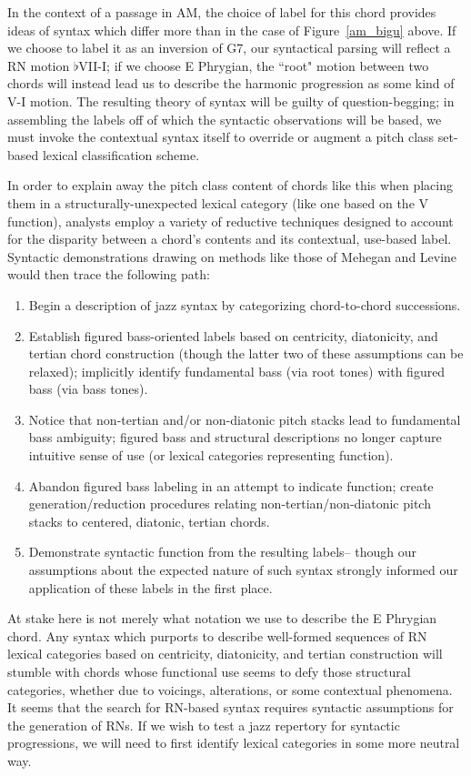 In the context of a passage in AM, the choice of label for this chord provides ideas of syntax which differ more than in the case of Figure~\ref{am_bigu} above.  If we choose to label it as an inversion of G7, our syntactical parsing will reflect a RN motion $\flat$VII-I; if we choose E Phrygian, the ``root" motion between two chords will instead lead us to describe the harmonic progression as some kind of V-I motion.  The resulting theory of syntax will be guilty of question-begging; in assembling the labels off of which the syntactic observations will be based, we must invoke the contextual syntax itself to override or augment a pitch class set-based lexical classification scheme.

In order to explain away the pitch class content of chords like this when placing them in a structurally-unexpected lexical category (like one based on the V function), analysts employ a variety of reductive techniques designed to account for the disparity between a chord's contents and its contextual, use-based label.  Syntactic demonstrations drawing on methods like those of Mehegan and Levine would then trace the following path:
\begin{enumerate}
	\item Begin a description of jazz syntax by categorizing chord-to-chord successions.
	\item Establish figured bass-oriented labels based on centricity, diatonicity, and tertian chord construction (though the latter two of these assumptions can be relaxed); implicitly identify fundamental bass (via root tones) with figured bass (via bass tones).
	\item Notice that non-tertian and/or non-diatonic pitch stacks lead to fundamental bass ambiguity; figured bass and structural descriptions no longer capture intuitive sense of use (or lexical categories representing function).
	\item Abandon figured bass labeling in an attempt to indicate function; create generation/reduction procedures relating non-tertian/non-diatonic pitch stacks to centered, diatonic, tertian chords.
	\item Demonstrate syntactic function from the resulting labels-- though our assumptions about the expected nature of such syntax strongly informed our application of these labels in the first place.
\end{enumerate}

At stake here is not merely what notation we use to describe the E Phrygian chord.  Any syntax which purports to describe well-formed sequences of RN lexical categories based on centricity, diatonicity, and tertian construction will stumble with chords whose functional use seems to defy those structural categories, whether due to voicings, alterations, or some contextual phenomena.  It seems that the search for RN-based syntax requires syntactic assumptions for the generation of RNs.  If we wish to test a jazz repertory for syntactic progressions, we will need to first identify lexical categories in some more neutral way.

